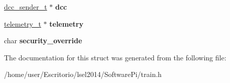 \begin{DoxyCompactItemize}
\item 
\hypertarget{structtrain__t_adf987895c09634e53848488117da976e}{\hyperlink{structdcc__sender__t}{dcc\-\_\-sender\-\_\-t} $\ast$ {\bfseries dcc}}\label{structtrain__t_adf987895c09634e53848488117da976e}

\item 
\hypertarget{structtrain__t_ad8c29a8f9543d94b27226af5926d2e7f}{\hyperlink{structtelemetry__t}{telemetry\-\_\-t} $\ast$ {\bfseries telemetry}}\label{structtrain__t_ad8c29a8f9543d94b27226af5926d2e7f}

\item 
\hypertarget{structtrain__t_af1798a3b0292a4180ea6cc6780d94846}{char {\bfseries security\-\_\-override}}\label{structtrain__t_af1798a3b0292a4180ea6cc6780d94846}

\end{DoxyCompactItemize}


\-The documentation for this struct was generated from the following file\-:\begin{DoxyCompactItemize}
\item 
/home/user/\-Escritorio/lsel2014/\-Software\-Pi/train.\-h\end{DoxyCompactItemize}
